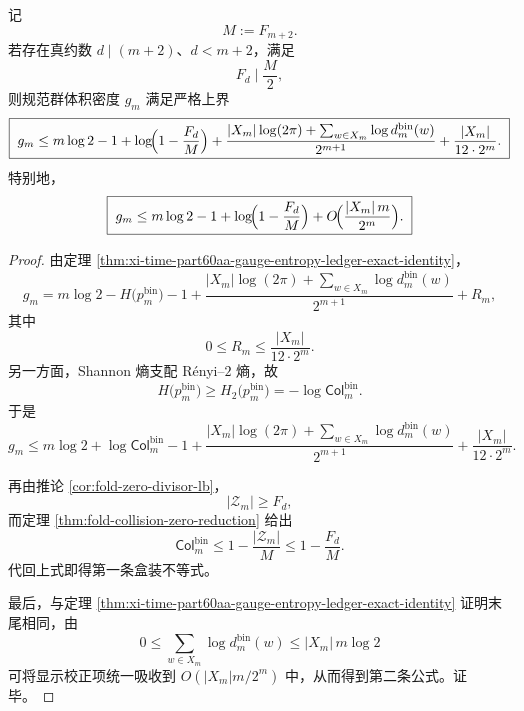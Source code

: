 \begin{theorem}[约数触发零余类并给出的规范群熵显式上界]\label{thm:xi-time-part60aa-divisor-zero-class-gauge-entropy-upper-bound}
记
\[
M:=F_{m+2}.
\]
若存在真约数 \(d\mid (m+2)\)、\(d<m+2\)，满足
\[
F_d\mid \frac{M}{2},
\]
则规范群体积密度 \(g_m\) 满足严格上界
\[
\boxed{\;
g_m
\le
m\log 2
-1
+\log\!\Bigl(1-\frac{F_d}{M}\Bigr)
+\frac{|X_m|\log(2\pi)+\sum_{w\in X_m}\log d_m^{\mathrm{bin}}(w)}{2^{m+1}}
+\frac{|X_m|}{12\cdot 2^m}.\;}
\]
特别地，
\[
\boxed{\;
g_m
\le
m\log 2
-1
+\log\!\Bigl(1-\frac{F_d}{M}\Bigr)
+O\!\Bigl(\frac{|X_m|\,m}{2^m}\Bigr).\;}
\]
\end{theorem}
\begin{proof}
由定理 \ref{thm:xi-time-part60aa-gauge-entropy-ledger-exact-identity}，
\[
g_m
=
m\log 2
-H\!\bigl(p_m^{\mathrm{bin}}\bigr)
-1
+\frac{|X_m|\log(2\pi)+\sum_{w\in X_m}\log d_m^{\mathrm{bin}}(w)}{2^{m+1}}
+R_m,
\]
其中
\[
0\le R_m\le \frac{|X_m|}{12\cdot 2^m}.
\]
另一方面，Shannon 熵支配 Rényi--\(2\) 熵，故
\[
H\!\bigl(p_m^{\mathrm{bin}}\bigr)\ge H_2\!\bigl(p_m^{\mathrm{bin}}\bigr)
=-\log \mathsf{Col}^{\mathrm{bin}}_m.
\]
于是
\[
g_m
\le
m\log 2
+\log \mathsf{Col}^{\mathrm{bin}}_m
-1
+\frac{|X_m|\log(2\pi)+\sum_{w\in X_m}\log d_m^{\mathrm{bin}}(w)}{2^{m+1}}
+\frac{|X_m|}{12\cdot 2^m}.
\]

再由推论 \ref{cor:fold-zero-divisor-lb}，
\[
|\mathcal Z_m|\ge F_d,
\]
而定理 \ref{thm:fold-collision-zero-reduction} 给出
\[
\mathsf{Col}^{\mathrm{bin}}_m
\le
1-\frac{|\mathcal Z_m|}{M}
\le
1-\frac{F_d}{M}.
\]
代回上式即得第一条盒装不等式。

最后，与定理 \ref{thm:xi-time-part60aa-gauge-entropy-ledger-exact-identity} 证明末尾相同，由
\[
0\le \sum_{w\in X_m}\log d_m^{\mathrm{bin}}(w)\le |X_m|\,m\log 2
\]
可将显示校正项统一吸收到
\(
O(|X_m|m/2^m)
\)
中，从而得到第二条公式。证毕。
\end{proof}

